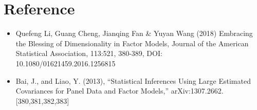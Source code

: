 \documentclass[10pt, oneside]{article}
\begin{document}
\section*{Reference}

\begin{itemize}
\item Quefeng Li, Guang Cheng, Jianqing Fan \& Yuyan Wang (2018) Embracing the Blessing of Dimensionality in Factor Models, Journal of the American Statistical Association, 113:521, 380-389, DOI: 10.1080/01621459.2016.1256815


\item Bai, J., and Liao, Y. (2013), “Statistical Inferences Using Large Estimated Covariances for Panel Data and Factor Models,” arXiv:1307.2662. [380,381,382,383]
\end{itemize}
\end{document}
